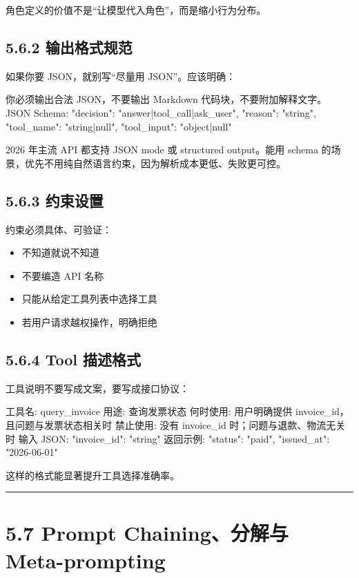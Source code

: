 角色定义的价值不是``让模型代入角色''，而是缩小行为分布。


\subsection{5.6.2 输出格式规范}

如果你要 JSON，就别写``尽量用 JSON''。应该明确：


\begin{codeblock}
你必须输出合法 JSON，不要输出 Markdown 代码块，不要附加解释文字。
JSON Schema:
{
  "decision": "answer|tool_call|ask_user",
  "reason": "string",
  "tool_name": "string|null",
  "tool_input": "object|null"
}
\end{codeblock}

2026 年主流 API 都支持 JSON mode 或 structured output。能用 schema 的场景，优先不用纯自然语言约束，因为解析成本更低、失败更可控。


\subsection{5.6.3 约束设置}

约束必须具体、可验证：


\begin{itemize}[leftmargin=2em]
\item 不知道就说不知道
\item 不要编造 API 名称
\item 只能从给定工具列表中选择工具
\item 若用户请求越权操作，明确拒绝
\end{itemize}

\subsection{5.6.4 Tool 描述格式}

工具说明不要写成文案，要写成接口协议：


\begin{codeblock}
工具名: query_invoice
用途: 查询发票状态
何时使用: 用户明确提供 invoice_id，且问题与发票状态相关时
禁止使用: 没有 invoice_id 时；问题与退款、物流无关时
输入 JSON:
{"invoice_id": "string"}
返回示例:
{"status": "paid", "issued_at": "2026-06-01"}
\end{codeblock}

这样的格式能显著提升工具选择准确率。


\bigskip\hrule\bigskip

\section{5.7 Prompt Chaining、分解与 Meta-prompting}

